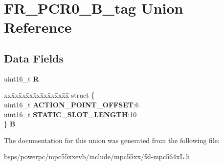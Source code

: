 \hypertarget{unionFR__PCR0__16B__tag}{}\section{F\+R\+\_\+\+P\+C\+R0\+\_\+B\+\_\+tag Union Reference}
\label{unionFR__PCR0__16B__tag}
\subsection*{Data Fields}
\begin{DoxyCompactItemize}
\item 
\mbox{\label{unionFR__PCR0__16B__tag_a8decb13d08563ae5b29f8d6ef8acf970}} 
uint16\+\_\+t {\bfseries R}
\item 
\mbox{\label{unionFR__PCR0__16B__tag_adf1d54c0a7c23d793391664d2a5ac005}} 
\begin{tabbing}
xx\=xx\=xx\=xx\=xx\=xx\=xx\=xx\=xx\=\kill
struct \{\\
\>uint16\_t {\bfseries ACTION\_POINT\_OFFSET}:6\\
\>uint16\_t {\bfseries STATIC\_SLOT\_LENGTH}:10\\
\} {\bfseries B}\\

\end{tabbing}\end{DoxyCompactItemize}


The documentation for this union was generated from the following file\+:\begin{DoxyCompactItemize}
\item 
bsps/powerpc/mpc55xxevb/include/mpc55xx/fsl-\/mpc564x\+L.\+h\end{DoxyCompactItemize}
